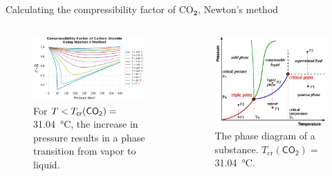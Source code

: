 %
%
\begin{frame}{Calculating the compressibility factor of CO$_{\boldsymbol{2}}$, Newton's method}
\begin{columns}[t]

\footnotesize
{}

\begin{figure}
\centering
\includegraphics[width=0.8\columnwidth]{figures/activity-models/co2-compressibility-factor-newton}
\caption{For $T < T_{\sf cr} (\mathsf{CO_2})= $ 31.04~°C, the increase in pressure results in a phase transition from vapor to liquid.}
\end{figure}


\begin{figure}
\centering
\includegraphics[width=0.8\columnwidth]{figures/activity-models/phase-diagram-pt-with-lines.png}
\caption{The phase diagram of a substance. $T_{\mathrm{cr}}(\mathsf{CO_2})=$  31.04~°C.}
\end{figure}


\end{columns}
\end{frame}
